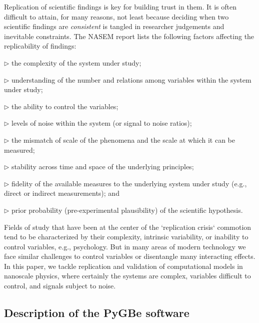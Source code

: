 Replication of scientific findings is key for building trust in them. 
It is often difficult to attain, for many reasons, not least because deciding when two scientific findings are \emph{consistent} is tangled in researcher judgements and inevitable constraints. 
The NASEM report lists the following factors affecting the replicability of findings: 

\begin{compactitem}

\item[$\triangleright$] the complexity of the system under study;
\item[$\triangleright$] understanding of the number and relations among variables within the system under study;
\item[$\triangleright$] the ability to control the variables; 
\item[$\triangleright$] levels of noise within the system (or signal to noise ratios);
\item[$\triangleright$] the mismatch of scale of the phenomena and the scale at which it can be measured; 
\item[$\triangleright$] stability across time and space of the underlying principles; 
\item[$\triangleright$] fidelity of the available measures to the underlying system under study (e.g., direct  or indirect measurements); and
\item[$\triangleright$] prior probability (pre-experimental plausibility) of the scientific hypothesis.

\end{compactitem}

\noindent
Fields of study that have been at the center of the `replication crisis` commotion tend to be characterized by their complexity, intrinsic variability, or inability to control variables, e.g., psychology. 
But in many areas of modern technology we face similar challenges to control variables or disentangle many interacting effects. 
In this paper, we tackle replication and validation of computational models in nanoscale physics, where certainly the systems are complex, variables difficult to control, and signals subject to noise.

\subsection{Description of the PyGBe software}

